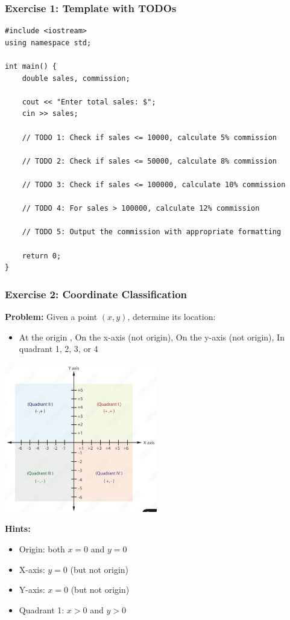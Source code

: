 \documentclass{beamer}
\begin{document}
\begin{frame}[fragile]
\frametitle{Exercise 1: Template with TODOs}

\begin{verbatim}
#include <iostream>
using namespace std;

int main() {
    double sales, commission;
    
    cout << "Enter total sales: $";
    cin >> sales;
    
    // TODO 1: Check if sales <= 10000, calculate 5% commission
    
    // TODO 2: Check if sales <= 50000, calculate 8% commission
    
    // TODO 3: Check if sales <= 100000, calculate 10% commission
    
    // TODO 4: For sales > 100000, calculate 12% commission
    
    // TODO 5: Output the commission with appropriate formatting
    
    return 0;
}
\end{verbatim}
\end{frame}

\begin{frame}[fragile]
\frametitle{Exercise 2: Coordinate Classification}
\textbf{Problem:} Given a point $(x, y)$, determine its location:
\begin{itemize}
    \item At the origin , On the x-axis (not origin), On the y-axis (not origin), In quadrant 1, 2, 3, or 4
\end{itemize}

\begin{center}
\includegraphics[width=0.5\textwidth]{../images/06_coordinate-plane-quadrants.jpg}
\end{center}

\vspace{0.2cm}
\textbf{Hints:}
\begin{itemize}
    \item Origin: both $x = 0$ and $y = 0$
    \item X-axis: $y = 0$ (but not origin)
    \item Y-axis: $x = 0$ (but not origin)
    \item Quadrant 1: $x > 0$ and $y > 0$
\end{itemize}
\end{frame}
\end{document}
